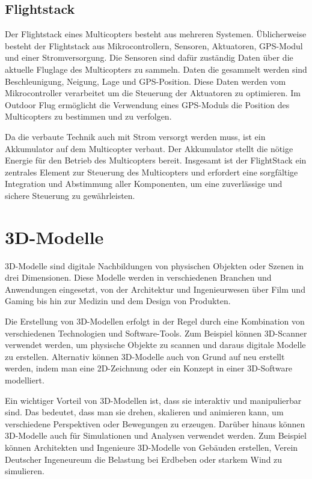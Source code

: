    
\subsection{Flightstack}

Der Flightstack eines Multicopters besteht aus mehreren Systemen. Üblicherweise besteht der Flightstack aus Mikrocontrollern, Sensoren, Aktuatoren, GPS-Modul und einer Stromversorgung. Die Sensoren sind dafür zuständig Daten über die aktuelle Fluglage des Multicopters zu sammeln. Daten die gesammelt werden sind Beschleunigung, Neigung, Lage und GPS-Position. Diese Daten werden vom Mikrocontroller verarbeitet um die Steuerung der Aktuatoren zu optimieren. Im Outdoor Flug ermöglicht die Verwendung eines GPS-Moduls die Position des Multicopters zu bestimmen und zu verfolgen.

Da die verbaute Technik auch mit Strom versorgt werden muss, ist ein Akkumulator auf dem Multicopter verbaut. Der Akkumulator stellt die nötige Energie für den Betrieb des Multicopters bereit. Insgesamt ist der FlightStack ein zentrales Element zur Steuerung des Multicopters und erfordert eine sorgfältige Integration und Abstimmung aller Komponenten, um eine zuverlässige und sichere Steuerung zu gewährleisten.


\section{3D-Modelle} \label{3d-modelle:section}
3D-Modelle sind digitale Nachbildungen von physischen Objekten oder Szenen in drei Dimensionen. Diese Modelle werden in verschiedenen Branchen und Anwendungen eingesetzt, von der Architektur und Ingenieurwesen über Film und Gaming bis hin zur Medizin und dem Design von Produkten.

Die Erstellung von 3D-Modellen erfolgt in der Regel durch eine Kombination von verschiedenen Technologien und Software-Tools. Zum Beispiel können 3D-Scanner verwendet werden, um physische Objekte zu scannen und daraus digitale Modelle zu erstellen. Alternativ können 3D-Modelle auch von Grund auf neu erstellt werden, indem man eine 2D-Zeichnung oder ein Konzept in einer 3D-Software modelliert.

Ein wichtiger Vorteil von 3D-Modellen ist, dass sie interaktiv und manipulierbar sind. Das bedeutet, dass man sie drehen, skalieren und animieren kann, um verschiedene Perspektiven oder Bewegungen zu erzeugen. Darüber hinaus können 3D-Modelle auch für Simulationen und Analysen verwendet werden. Zum Beispiel können Architekten und Ingenieure 3D-Modelle von Gebäuden erstellen, Verein Deutscher Ingeneureum die Belastung bei Erdbeben oder starkem Wind zu simulieren.


